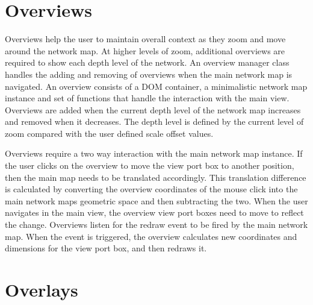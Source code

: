 \documentclass[11pt, a4paper]{report}
\begin{document}
\section{Overviews}
\label{sec:overviews.impl}

Overviews help the user to maintain overall context as they zoom and move around
the network map. At higher levels of zoom, additional overviews are required to
show each depth level of the network. An overview manager class handles the
adding and removing of overviews when the main network map is navigated. An
overview consists of a DOM container, a minimalistic network map instance and set
of functions that handle the interaction with the main view. Overviews are added
when the current depth level of the network map increases and removed when it
decreases. The depth level is defined by the current level of zoom compared with
the user defined scale offset values.

Overviews require a two way interaction with the main network map instance. If
the user clicks on the overview to move the view port box to another position,
then the main map needs to be translated accordingly. This translation
difference is calculated by converting the overview coordinates of the mouse
click into the main network maps geometric space and then subtracting the two.
When the user navigates in the main view, the overview view port boxes need to
move to reflect the change. Overviews listen for the redraw event to be fired by
the main network map. When the event is triggered, the overview calculates new
coordinates and dimensions for the view port box, and then redraws it.


\section{Overlays}
\label{sec:overlays.impl}
\end{document}

